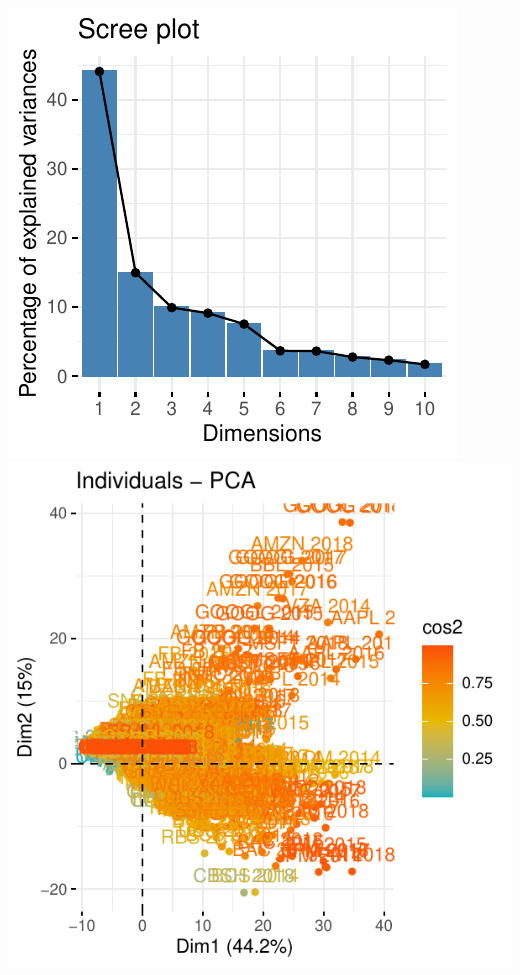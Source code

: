 \documentclass[11pt,]{article}
\begin{document}
\includegraphics{stock_analysis_files/figure-latex/scree-1.pdf}
\includegraphics{stock_analysis_files/figure-latex/PCAind-1.pdf}
\end{document}
